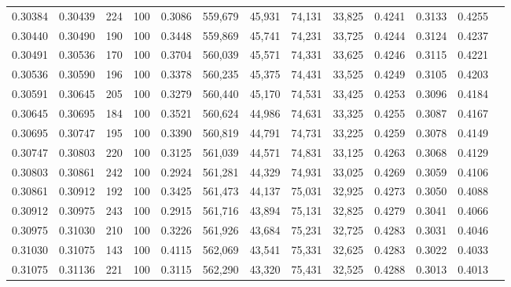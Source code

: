 \begin{tabular}{rrrrrrrrrrrrr}
0.30384 & 0.30439 &   224 & 100 &                                     0.3086 & 559,679 &  45,931 &  74,131 &  33,825 & 0.4241 & 0.3133 & 0.4255 \\
0.30440 & 0.30490 &   190 & 100 &                                     0.3448 & 559,869 &  45,741 &  74,231 &  33,725 & 0.4244 & 0.3124 & 0.4237 \\
0.30491 & 0.30536 &   170 & 100 &                                     0.3704 & 560,039 &  45,571 &  74,331 &  33,625 & 0.4246 & 0.3115 & 0.4221 \\
0.30536 & 0.30590 &   196 & 100 &                                     0.3378 & 560,235 &  45,375 &  74,431 &  33,525 & 0.4249 & 0.3105 & 0.4203 \\
0.30591 & 0.30645 &   205 & 100 &                                     0.3279 & 560,440 &  45,170 &  74,531 &  33,425 & 0.4253 & 0.3096 & 0.4184 \\
0.30645 & 0.30695 &   184 & 100 &                                     0.3521 & 560,624 &  44,986 &  74,631 &  33,325 & 0.4255 & 0.3087 & 0.4167 \\
0.30695 & 0.30747 &   195 & 100 &                                     0.3390 & 560,819 &  44,791 &  74,731 &  33,225 & 0.4259 & 0.3078 & 0.4149 \\
0.30747 & 0.30803 &   220 & 100 &                                     0.3125 & 561,039 &  44,571 &  74,831 &  33,125 & 0.4263 & 0.3068 & 0.4129 \\
0.30803 & 0.30861 &   242 & 100 &                                     0.2924 & 561,281 &  44,329 &  74,931 &  33,025 & 0.4269 & 0.3059 & 0.4106 \\
0.30861 & 0.30912 &   192 & 100 &                                     0.3425 & 561,473 &  44,137 &  75,031 &  32,925 & 0.4273 & 0.3050 & 0.4088 \\
0.30912 & 0.30975 &   243 & 100 &                                     0.2915 & 561,716 &  43,894 &  75,131 &  32,825 & 0.4279 & 0.3041 & 0.4066 \\
0.30975 & 0.31030 &   210 & 100 &                                     0.3226 & 561,926 &  43,684 &  75,231 &  32,725 & 0.4283 & 0.3031 & 0.4046 \\
0.31030 & 0.31075 &   143 & 100 &                                     0.4115 & 562,069 &  43,541 &  75,331 &  32,625 & 0.4283 & 0.3022 & 0.4033 \\
0.31075 & 0.31136 &   221 & 100 &                                     0.3115 & 562,290 &  43,320 &  75,431 &  32,525 & 0.4288 & 0.3013 & 0.4013 \\

\end{tabular}
